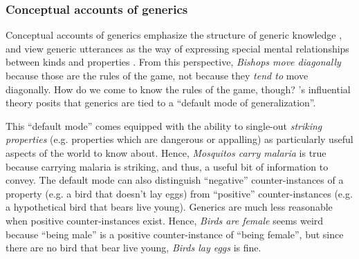 \documentclass[12pt,letterpaper]{article}
\newcommand{\mht}[1]{\textcolor{Blue}{[mht: #1]}}
\begin{document}
\subsubsection*{Conceptual accounts of generics}

Conceptual accounts of generics emphasize the structure of generic knowledge \cite{Prasada2000}, and view generic utterances as the way of expressing special mental relationships between kinds and properties \cite{Leslie2008, Prasada2012}.
From this perspective, \emph{Bishops move diagonally} because those are the rules of the game, not because they \emph{tend to} move diagonally.
How do we come to know the rules of the game, though?
's influential theory posits that generics are tied to a ``default mode of generalization''. 

This ``default mode'' comes equipped with the ability to single-out \emph{striking properties} (e.g. properties which are dangerous or appalling) as particularly useful aspects of the world to know about. 
Hence, \emph{Mosquitos carry malaria} is true because carrying malaria is striking, and thus, a useful bit of information to convey.
The default mode can also distinguish ``negative'' counter-instances of a property   (e.g. a bird that doesn't lay eggs) from ``positive'' counter-instances (e.g. a hypothetical bird that bears live young).
Generics are much less reasonable when positive counter-instances exist. Hence, \emph{Birds are female} seems weird because ``being male'' is a positive counter-instance of ``being female'', but since there are no bird that bear live young,  \emph{Birds lay eggs} is fine.

\end{document}
